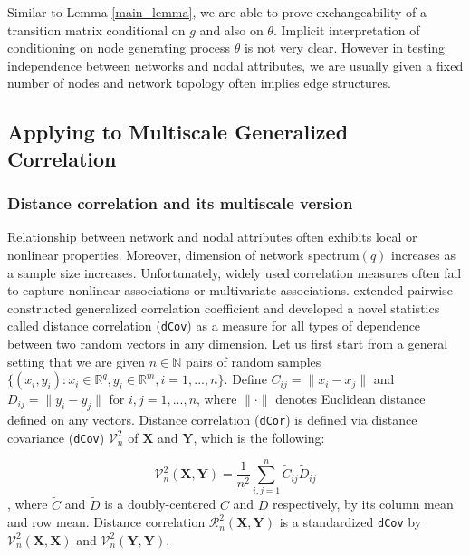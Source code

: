 \documentclass[12pt]{article}
\theoremstyle{definition}
\begin{document}
Similar to Lemma \ref{main_lemma}, we are able to prove exchangeability of a transition matrix conditional on $g$ and also on $\theta$. Implicit interpretation of conditioning on node generating process $\theta$ is not very clear. However in testing independence between networks and nodal attributes, we are usually given a fixed number of nodes and network topology often implies edge structures. 
	
\subsection{Applying to Multiscale Generalized Correlation}
	
\subsubsection{Distance correlation and its multiscale version}
	
Relationship between network and nodal attributes often exhibits local or nonlinear properties. Moreover, dimension of network spectrum$(q)$ increases as a sample size increases. Unfortunately, widely used correlation measures often fail to capture nonlinear associations or multivariate associations. \cite{szekely2007measuring} extended pairwise constructed generalized correlation coefficient and developed a novel statistics called distance correlation (\texttt{dCov}) as a measure for all types of dependence between two random vectors in any dimension. Let us first start from a general setting that we are given $n \in \mathbb{N}$ pairs of random samples $\{ (x_{i}, y_{i}) : x_{i} \in \mathbb{R}^{q}, y_{i} \in \mathbb{R}^{m}, i = 1,...,n \}$. Define $C_{ij} = \parallel x_{i} - x_{j} \parallel$ and $D_{ij} = \parallel y_{i} - y_{j} \parallel$ for $i,j=1,...,n$, where $\parallel \cdot \parallel$ denotes Euclidean distance defined on any vectors.   
Distance correlation (\texttt{dCor}) is defined via distance covariance (\texttt{dCov}) $\mathcal{V}^2_{n}$ of $\boldsymbol{X}$ and $\boldsymbol{Y}$, which is the following: 
	
\begin{equation}	 
\mathcal{V}^2_{n}(\boldsymbol{X}, \boldsymbol{Y}) = \frac{1}{n^2} \sum\limits_{i,j=1}^{n} \tilde{C}_{ij} \tilde{D}_{ij}
\end{equation}
, where $\tilde{C}$ and $\tilde{D}$ is a doubly-centered $C$ and $D$ respectively, by its column mean and row mean. Distance correlation $\mathcal{R}^{2}_{n}(\boldsymbol{X}, \boldsymbol{Y})$ is a standardized \texttt{dCov} by $\mathcal{V}^2_{n}(\boldsymbol{X}, \boldsymbol{X})$ and $\mathcal{V}^2_{n}(\boldsymbol{Y}, \boldsymbol{Y}).$
	
\end{document}

